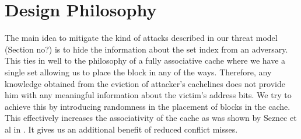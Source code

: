 \section{Design Philosophy}
The main idea to mitigate the kind of attacks described in our threat model (Section no?) is to hide the information about the set index from an adversary. This ties in well to the philosophy of a fully associative cache where we have a single set allowing us to place the block in any of the ways. Therefore, any knowledge obtained from the eviction of attacker's cachelines does not provide him with any meaningful information about the victim's address bits. We try to achieve this by introducing randomness in the placement of blocks in the cache. This effectively increases the associativity of the cache as was shown by Seznec et al in \cite{skewed cache}. It gives us an additional benefit of reduced conflict misses.
